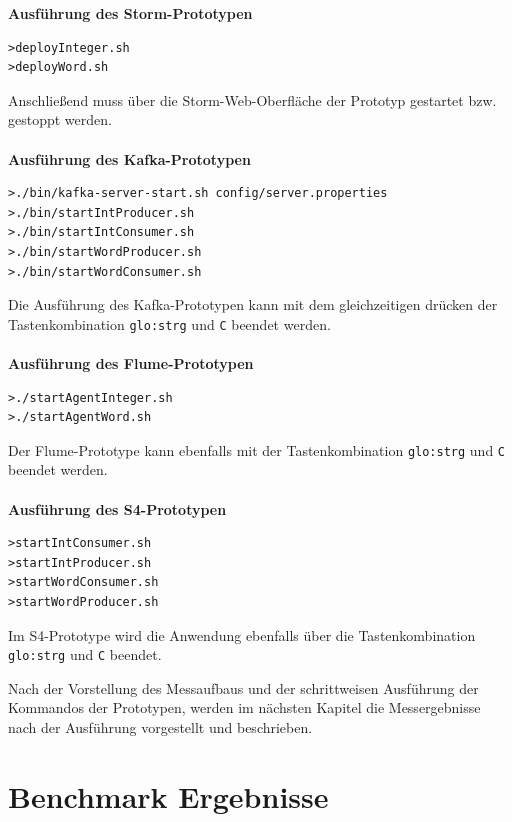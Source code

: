 \textbf{Ausführung des Storm-Prototypen}

\begin{verbatim}
>deployInteger.sh
>deployWord.sh
\end{verbatim}

Anschließend muss über die Storm-Web-Oberfläche der Prototyp gestartet bzw. gestoppt werden.\\\\


\textbf{Ausführung des Kafka-Prototypen}

\begin{verbatim}
>./bin/kafka-server-start.sh config/server.properties
>./bin/startIntProducer.sh
>./bin/startIntConsumer.sh
>./bin/startWordProducer.sh
>./bin/startWordConsumer.sh
\end{verbatim}

Die Ausführung des Kafka-Prototypen kann mit dem gleichzeitigen drücken der Tastenkombination \texttt{\gls{glo:strg}} und \texttt{C} beendet werden.\\\\


\textbf{Ausführung des Flume-Prototypen}

\begin{verbatim}
>./startAgentInteger.sh
>./startAgentWord.sh
\end{verbatim}

Der Flume-Prototype kann ebenfalls mit der Tastenkombination \texttt{\gls{glo:strg}} und \texttt{C} beendet werden.\\\\


\textbf{Ausführung des S4-Prototypen}

\begin{verbatim}
>startIntConsumer.sh
>startIntProducer.sh
>startWordConsumer.sh
>startWordProducer.sh
\end{verbatim}

Im S4-Prototype wird die Anwendung ebenfalls über die Tastenkombination \texttt{\gls{glo:strg}} und \texttt{C} beendet.

Nach der Vorstellung des Messaufbaus und der schrittweisen Ausführung der Kommandos der Prototypen, werden im nächsten Kapitel die Messergebnisse nach der Ausführung vorgestellt und beschrieben.

\section{Benchmark Ergebnisse}
\label{sec:benchmarkErgebnisse}

